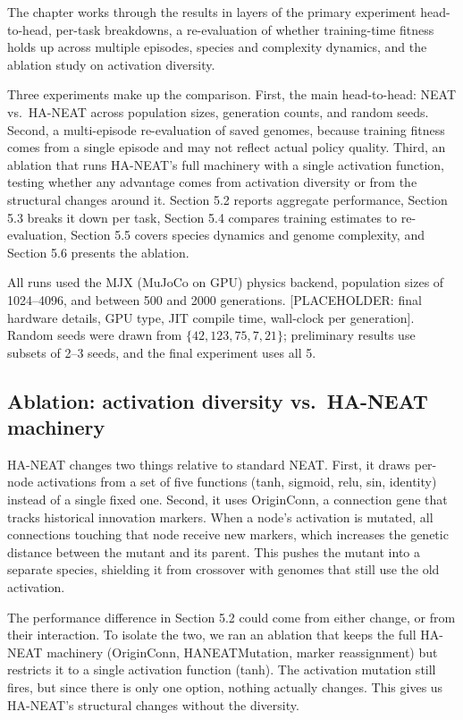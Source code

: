 \documentclass[12pt]{article}
\begin{document}
The chapter works through the results in layers of the primary experiment head-to-head, per-task breakdowns, a re-evaluation of whether training-time fitness holds up across multiple episodes, species and complexity dynamics, and the ablation study on activation diversity.

Three experiments make up the comparison. First, the main head-to-head: NEAT vs.\ HA-NEAT across population sizes, generation counts, and random seeds. Second, a multi-episode re-evaluation of saved genomes, because training fitness comes from a single episode and may not reflect actual policy quality. Third, an ablation that runs HA-NEAT's full machinery with a single activation function, testing whether any advantage comes from activation diversity or from the structural changes around it. Section 5.2 reports aggregate performance, Section 5.3 breaks it down per task, Section 5.4 compares training estimates to re-evaluation, Section 5.5 covers species dynamics and genome complexity, and Section 5.6 presents the ablation.

All runs used the MJX (MuJoCo on GPU) physics backend, population sizes of 1024--4096, and between 500 and 2000 generations. [PLACEHOLDER: final hardware details, GPU type, JIT compile time, wall-clock per generation]. Random seeds were drawn from $\{42, 123, 75, 7, 21\}$; preliminary results use subsets of 2--3 seeds, and the final experiment uses all 5.

\subsection{Ablation: activation diversity vs.\ HA-NEAT machinery}
HA-NEAT changes two things relative to standard NEAT. First, it draws per-node activations from a set of five functions (tanh, sigmoid, relu, sin, identity) instead of a single fixed one. Second, it uses OriginConn, a connection gene that tracks historical innovation markers. When a node's activation is mutated, all connections touching that node receive new markers, which increases the genetic distance between the mutant and its parent. This pushes the mutant into a separate species, shielding it from crossover with genomes that still use the old activation.

The performance difference in Section 5.2 could come from either change, or from their interaction. To isolate the two, we ran an ablation that keeps the full HA-NEAT machinery (OriginConn, HANEATMutation, marker reassignment) but restricts it to a single activation function (tanh). The activation mutation still fires, but since there is only one option, nothing actually changes. This gives us HA-NEAT's structural changes without the diversity.
\end{document}
